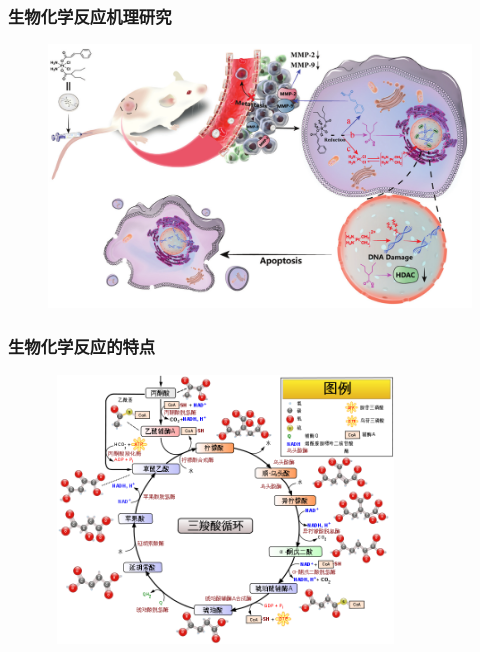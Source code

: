 \frame
{
	\frametitle{生物化学反应机理研究}
\begin{figure}[h!]
\centering
\vspace{-8.5pt}
\includegraphics[height=0.67\textwidth,width=1.0\textwidth,viewport=0 0 1380 900,clip]{Figures/anti-tumour_mechanism-of the-Cin-Pt(IV)-Val-complex.png}
\label{mechanism}
\end{figure}
}

\frame
{
	\frametitle{生物化学反应的特点}
\begin{figure}[h!]
\centering
\vspace{-10.5pt}
\includegraphics[height=2.80in,width=3.70in,viewport=0 0 750 600,clip]{Figures/Citric_acid_cycle_with_aconitate_Chinese.png}
\label{Bio-Chem}
\end{figure}
}


